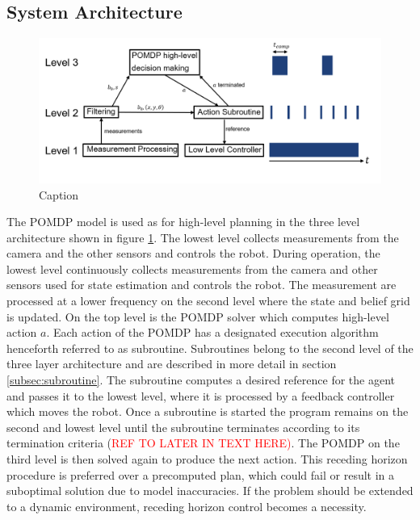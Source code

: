 \subsection{System Architecture}\label{subsec:sysarch}
\begin{figure}
    \centering
    \includegraphics[width=1.0\textwidth]{Report/images/3LevelArchitecture_botha.png}
    \caption{Caption}
    \label{fig:3levelsarchitecture}
\end{figure}
%
The POMDP model is used as for high-level planning in the three level architecture shown in figure \ref{fig:3levelsarchitecture}. The lowest level collects measurements from the camera and the other sensors and controls the robot. During operation, the lowest level continuously collects measurements from the camera and other sensors used for state estimation and controls the robot. The measurement are processed at a lower frequency on the second level where the state and belief grid is updated. On the top level is the POMDP solver which computes high-level action $a$. Each action of the POMDP has a designated execution algorithm henceforth referred to as subroutine. Subroutines belong to the second level of the three layer architecture and are described in more detail in section \ref{subsec:subroutine}. The subroutine computes a desired reference for the agent and passes it to the lowest level, where it is processed by a feedback controller which moves the robot. Once a subroutine is started the program remains on the second and lowest level until the subroutine terminates according to its termination criteria (\textcolor{red}{REF TO LATER IN TEXT HERE)}. The POMDP on the third level is then solved again to produce the next action. This receding horizon procedure is preferred over a precomputed plan, which could fail or result in a suboptimal solution due to model inaccuracies. If the problem should be extended to a dynamic environment, receding horizon control becomes a necessity.\\

